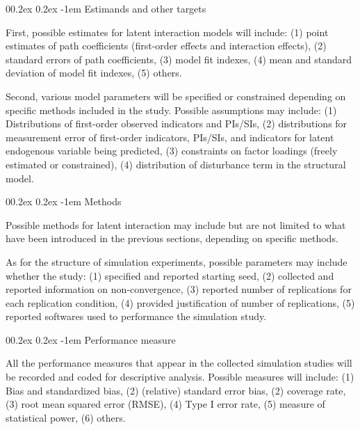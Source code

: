 \documentclass[
  11pt,
  man]{apa6}
\makeatletter
\let\oldparagraph\paragraph
\renewcommand{\paragraph}[1]{\oldparagraph{#1}\mbox{}}
\renewcommand{\paragraph}{\@startsection{paragraph}{4}{\parindent}%
  {0\baselineskip \@plus 0.2ex \@minus 0.2ex}%
  {-1em}%
  {\normalfont\normalsize\bfseries\itshape\typesectitle}}
\makeatother
\begin{document}
\hypertarget{estimands-and-other-targets}{%
\paragraph{Estimands and other targets}\label{estimands-and-other-targets}}

First, possible estimates for latent interaction models will include: (1) point estimates of path coefficients (first-order effects and interaction effects), (2) standard errors of path coefficients, (3) model fit indexes, (4) mean and standard deviation of model fit indexes, (5) others.

Second, various model parameters will be specified or constrained depending on specific methods included in the study. Possible assumptions may include: (1) Distributions of first-order observed indicators and PIs/SIs, (2) distributions for measurement error of first-order indicators, PIs/SIs, and indicators for latent endogenous variable being predicted, (3) constraints on factor loadings (freely estimated or constrained), (4) distribution of disturbance term in the structural model.

\hypertarget{methods}{%
\paragraph{Methods}\label{methods}}

Possible methods for latent interaction may include but are not limited to what have been introduced in the previous sections, depending on specific methods.

As for the structure of simulation experiments, possible parameters may include whether the study: (1) specified and reported starting seed, (2) collected and reported information on non-convergence, (3) reported number of replications for each replication condition, (4) provided justification of number of replications, (5) reported softwares used to performance the simulation study.

\hypertarget{performance-measure}{%
\paragraph{Performance measure}\label{performance-measure}}

All the performance measures that appear in the collected simulation studies will be recorded and coded for descriptive analysis. Possible measures will include: (1) Bias and standardized bias, (2) (relative) standard error bias, (2) coverage rate, (3) root mean squared error (RMSE), (4) Type I error rate, (5) measure of statistical power, (6) others.
\end{document}
